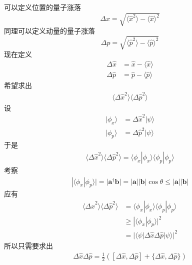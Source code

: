         可以定义位置的量子涨落
        \begin{equation*}
            \Delta x = \sqrt{\langle \hat{x}^2 \rangle - \langle \hat{x} \rangle^2}
        \end{equation*}
        同理可以定义动量的量子涨落
        \begin{equation*}
            \Delta p = \sqrt{\langle \hat{p}^2 \rangle - \langle \hat{p} \rangle^2}
        \end{equation*}
        现在定义 
        \begin{align*}
            \Delta \hat{x} &= \hat{x} - \langle \hat{x} \rangle \\
            \Delta \hat{p} &= \hat{p} - \langle \hat{p} \rangle
        \end{align*}
        希望求出
        \begin{align*}
            \langle \Delta \hat{x}^2\rangle\langle \Delta \hat{p}^2\rangle
        \end{align*}
        设
        \begin{align*}
            |\phi_x \rangle &= \Delta \hat{x}^2|\psi\rangle\\
            |\phi_p \rangle &= \Delta \hat{p}^2|\psi\rangle
        \end{align*}
        于是 
        \begin{align*}
            \langle \Delta \hat{x}^2\rangle\langle \Delta \hat{p}^2\rangle = \langle \phi_x | \phi_x \rangle \langle \phi_p | \phi_p \rangle
        \end{align*}
        考察
        \begin{align*}
            |\langle \phi_x | \phi_p \rangle| = |\bm{a}^\dagger \bm{b}| = |\bm{a}||\bm{b}|\cos{\theta} \leqslant |\bm{a}||\bm{b}|
        \end{align*}
        应有
        \begin{align*}
            \langle \Delta \hat{x}^2\rangle\langle \Delta \hat{p}^2\rangle &= \langle \phi_x | \phi_x \rangle \langle \phi_p | \phi_p \rangle\\ &\geqslant |\langle \phi_x|\phi_p \rangle|^2\\
            &= |\langle \psi |\Delta \hat{x} \Delta \hat{p}|\psi \rangle|^2
        \end{align*}
        所以只需要求出
        \begin{align*}
            \Delta \hat{x} \Delta \hat{p} = \frac 12([\Delta \hat{x}, \Delta \hat{p}] + \{\Delta \hat{x}, \Delta \hat{p}\})
        \end{align*}
